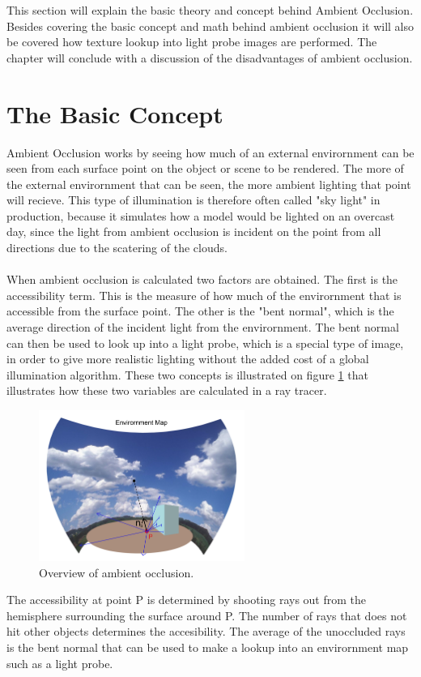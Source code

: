 This section will explain the basic theory and concept behind Ambient Occlusion. Besides covering the basic concept and math behind ambient occlusion it will also be covered how texture lookup into light probe images are performed. The chapter will conclude with a discussion of the disadvantages of ambient occlusion.
\section{The Basic Concept}
Ambient Occlusion works by seeing how much of an external envirornment can be seen from each surface point on the object or scene to be rendered. The more of the external envirornment that can be seen, the more ambient lighting that point will recieve. This type of illumination is therefore often called "sky light" in production, because it simulates how a model would be lighted on an overcast day, since the light from ambient occlusion is incident on the point from all directions due to the scatering of the clouds.
\\ \\
When ambient occlusion is calculated two factors are obtained. The first is the accessibility term. This is the measure of how much of the envirornment that is accessible from the surface point. The other is the "bent normal", which is the average direction of the incident light from the envirornment. The bent normal can then be used to look up into a light probe, which is a special type of image, in order to give more realistic lighting without the added cost of a global illumination algorithm. These two concepts is illustrated on figure \ref{fig:overview} that illustrates how these two variables are calculated in a ray tracer.
\begin{figure}[h]
	\centering	\includegraphics[width=0.6\textwidth]{Theory/overview}\caption{Overview of ambient occlusion.}\label{fig:overview}
\end{figure}
The accessibility at point P is determined by shooting rays out from the hemisphere surrounding the surface around P. The number of rays that does not hit other objects determines the accesibility. The average of the unoccluded rays is the bent normal that can be used to make a lookup into an envirornment map such as a light probe.
